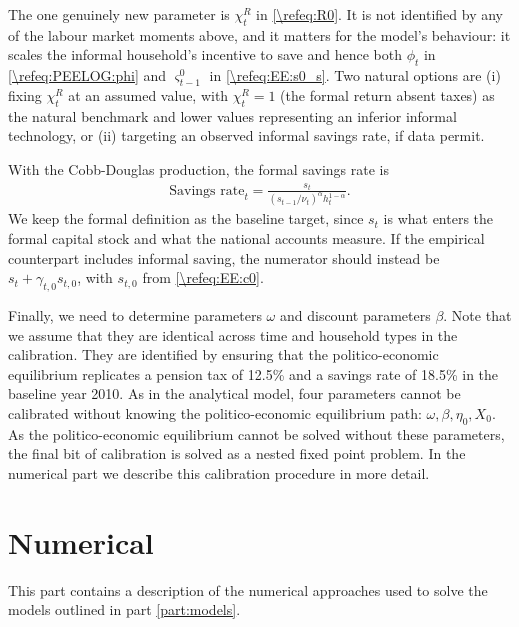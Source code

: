 \documentclass[a4paper]{article}
\begin{document}
 The one genuinely new parameter is $\chi_t^R$ in \eqref{\refeq:R0}. It is not identified by any of the labour market moments above, and it matters for the model's behaviour: it scales the informal household's incentive to save and hence both $\phi_t$ in \eqref{\refeq:PEELOG:phi} and $\varsigma_{t-1}^0$ in \eqref{\refeq:EE:s0_s}. Two natural options are (i) fixing $\chi_t^R$ at an assumed value, with $\chi_t^R = 1$ (the formal return absent taxes) as the natural benchmark and lower values representing an inferior informal technology, or (ii) targeting an observed informal savings rate, if data permit.

 With the Cobb-Douglas production, the formal savings rate is
\begin{align*}
    \text{Savings rate}_t = \frac{s_t}{\left(s_{t-1}/\nu_t\right)^{\alpha} h_t^{1-\alpha}}.
\end{align*}
We keep the formal definition as the baseline target, since $s_t$ is what enters the formal capital stock and what the national accounts measure. If the empirical counterpart includes informal saving, the numerator should instead be $s_t+\gamma_{t,0}s_{t,0}$, with $s_{t,0}$ from \eqref{\refeq:EE:c0}.

Finally, we need to determine parameters $\omega$ and discount parameters $\beta$. Note that we assume that they are identical across time and household types in the calibration. They are identified by ensuring that the politico-economic equilibrium replicates a pension tax of 12.5\% and a savings rate of 18.5\% in the baseline year 2010. As in the analytical model, four parameters cannot be calibrated without knowing the politico-economic equilibrium path: $\omega, \beta, \eta_0, X_0$. As the politico-economic equilibrium cannot be solved without these parameters, the final bit of calibration is solved as a nested fixed point problem. In the numerical part \ref{part:num} we describe this calibration procedure in more detail.




\clearpage
\part{Numerical}\label{part:num}

This part contains a description of the numerical approaches used to solve the models outlined in part \ref{part:models}.



\edef\refsec{sec:num:infsav}
\edef\refeq{eq:num:infsav}




\end{document}
